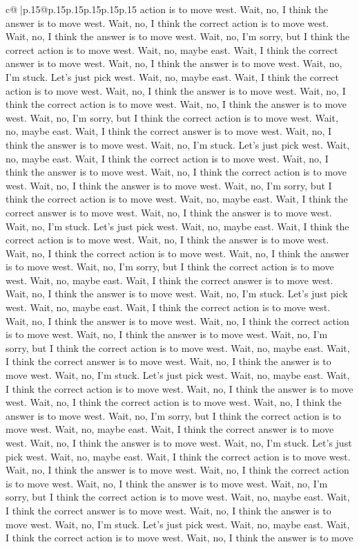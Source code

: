 \documentclass{article}
\begin{document}
{\begin{supertabular}{c@{$\;$}|p{.15\linewidth}@{}p{.15\linewidth}p{.15\linewidth}p{.15\linewidth}p{.15\linewidth}p{.15\linewidth}}
{{{action is to move west. Wait, no, I think the answer is to move west. Wait, no, I think the correct action is to move west. Wait, no, I think the answer is to move west. Wait, no, I'm sorry, but I think the correct action is to move west. Wait, no, maybe east. Wait, I think the correct answer is to move west. Wait, no, I think the answer is to move west. Wait, no, I'm stuck. Let's just pick west. Wait, no, maybe east. Wait, I think the correct action is to move west. Wait, no, I think the answer is to move west. Wait, no, I think the correct action is to move west. Wait, no, I think the answer is to move west. Wait, no, I'm sorry, but I think the correct action is to move west. Wait, no, maybe east. Wait, I think the correct answer is to move west. Wait, no, I think the answer is to move west. Wait, no, I'm stuck. Let's just pick west. Wait, no, maybe east. Wait, I think the correct action is to move west. Wait, no, I think the answer is to move west. Wait, no, I think the correct action is to move west. Wait, no, I think the answer is to move west. Wait, no, I'm sorry, but I think the correct action is to move west. Wait, no, maybe east. Wait, I think the correct answer is to move west. Wait, no, I think the answer is to move west. Wait, no, I'm stuck. Let's just pick west. Wait, no, maybe east. Wait, I think the correct action is to move west. Wait, no, I think the answer is to move west. Wait, no, I think the correct action is to move west. Wait, no, I think the answer is to move west. Wait, no, I'm sorry, but I think the correct action is to move west. Wait, no, maybe east. Wait, I think the correct answer is to move west. Wait, no, I think the answer is to move west. Wait, no, I'm stuck. Let's just pick west. Wait, no, maybe east. Wait, I think the correct action is to move west. Wait, no, I think the answer is to move west. Wait, no, I think the correct action is to move west. Wait, no, I think the answer is to move west. Wait, no, I'm sorry, but I think the correct action is to move west. Wait, no, maybe east. Wait, I think the correct answer is to move west. Wait, no, I think the answer is to move west. Wait, no, I'm stuck. Let's just pick west. Wait, no, maybe east. Wait, I think the correct action is to move west. Wait, no, I think the answer is to move west. Wait, no, I think the correct action is to move west. Wait, no, I think the answer is to move west. Wait, no, I'm sorry, but I think the correct action is to move west. Wait, no, maybe east. Wait, I think the correct answer is to move west. Wait, no, I think the answer is to move west. Wait, no, I'm stuck. Let's just pick west. Wait, no, maybe east. Wait, I think the correct action is to move west. Wait, no, I think the answer is to move west. Wait, no, I think the correct action is to move west. Wait, no, I think the answer is to move west. Wait, no, I'm sorry, but I think the correct action is to move west. Wait, no, maybe east. Wait, I think the correct answer is to move west. Wait, no, I think the answer is to move west. Wait, no, I'm stuck. Let's just pick west. Wait, no, maybe east. Wait, I think the correct action is to move west. Wait, no, I think the answer is to move }}}
\end{supertabular}}
\end{document}
